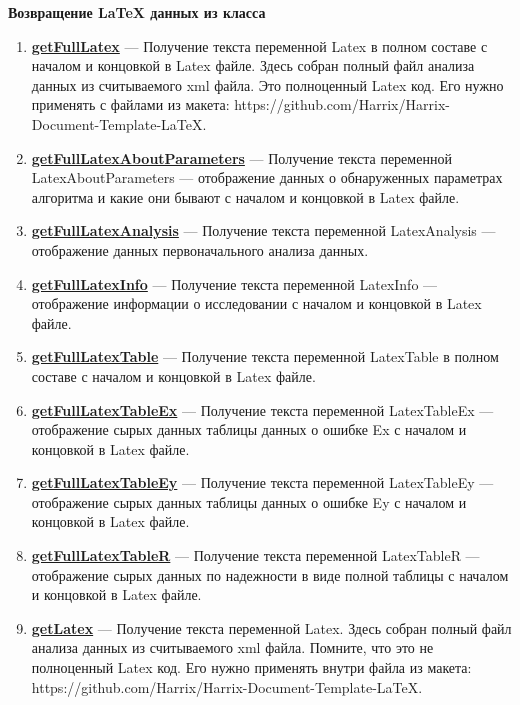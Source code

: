 \documentclass[a4paper,12pt]{article}
\begin{document}
\textbf{Возвращение LaTeX данных из класса}
\begin{enumerate}

\item \textbf{\hyperref[getFullLatex]{getFullLatex}} --- Получение текста переменной Latex в полном составе с началом и концовкой в Latex файле. Здесь собран полный файл анализа данных из считываемого xml файла. Это полноценный Latex код. Его нужно применять с файлами из макета: https://github.com/Harrix/Harrix-Document-Template-LaTeX.

\item \textbf{\hyperref[getFullLatexAboutParameters]{getFullLatexAboutParameters}} --- Получение текста переменной LatexAboutParameters --- отображение данных о обнаруженных параметрах алгоритма и какие они бывают с началом и концовкой в Latex файле.

\item \textbf{\hyperref[getFullLatexAnalysis]{getFullLatexAnalysis}} --- Получение текста переменной LatexAnalysis --- отображение данных первоначального анализа данных.

\item \textbf{\hyperref[getFullLatexInfo]{getFullLatexInfo}} --- Получение текста переменной LatexInfo --- отображение информации о исследовании с началом и концовкой в Latex файле.

\item \textbf{\hyperref[getFullLatexTable]{getFullLatexTable}} --- Получение текста переменной LatexTable в полном составе с началом и концовкой в Latex файле.

\item \textbf{\hyperref[getFullLatexTableEx]{getFullLatexTableEx}} --- Получение текста переменной LatexTableEx --- отображение сырых данных таблицы данных о ошибке Ex с началом и концовкой в Latex файле.

\item \textbf{\hyperref[getFullLatexTableEy]{getFullLatexTableEy}} --- Получение текста переменной LatexTableEy --- отображение сырых данных таблицы данных о ошибке Ey с началом и концовкой в Latex файле.

\item \textbf{\hyperref[getFullLatexTableR]{getFullLatexTableR}} --- Получение текста переменной LatexTableR --- отображение сырых данных по надежности в виде полной таблицы с началом и концовкой в Latex файле.

\item \textbf{\hyperref[getLatex]{getLatex}} --- Получение текста переменной Latex. Здесь собран полный файл анализа данных из считываемого xml файла. Помните, что это не полноценный Latex код. Его нужно применять внутри файла из макета: https://github.com/Harrix/Harrix-Document-Template-LaTeX.


\end{enumerate}
\end{document}
